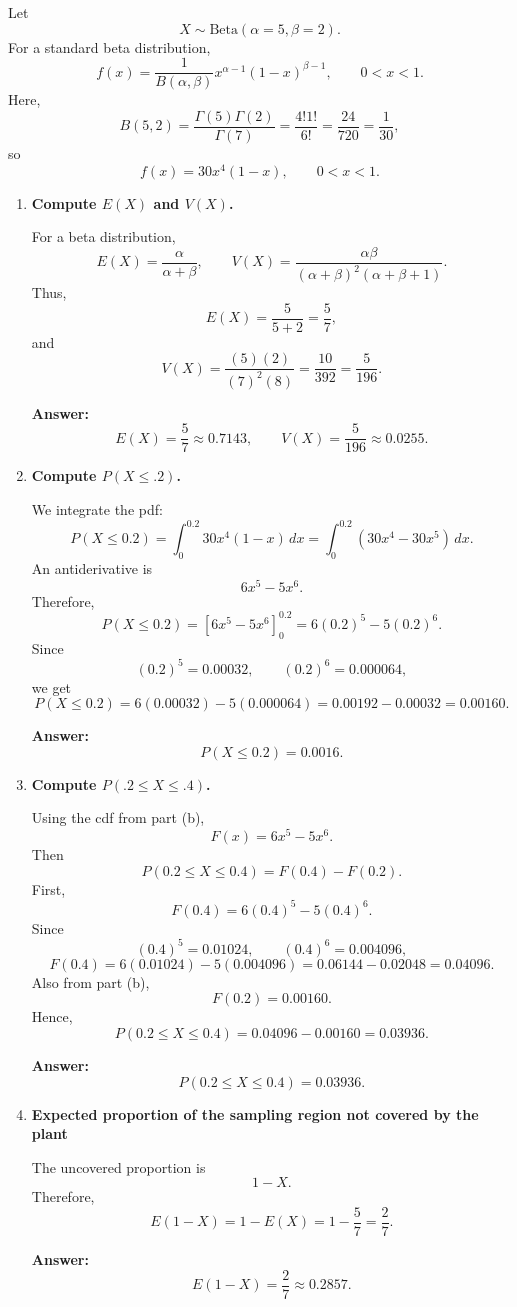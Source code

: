 Let
\[
X\sim \text{Beta}(\alpha=5,\beta=2).
\]
For a standard beta distribution,
\[
f(x)=\frac{1}{B(\alpha,\beta)}x^{\alpha-1}(1-x)^{\beta-1}, \qquad 0<x<1.
\]
Here,
\[
B(5,2)=\frac{\Gamma(5)\Gamma(2)}{\Gamma(7)}=\frac{4!1!}{6!}=\frac{24}{720}=\frac{1}{30},
\]
so
\[
f(x)=30x^4(1-x), \qquad 0<x<1.
\]

\begin{enumerate}
    \item[(a)] \textbf{Compute $E(X)$ and $V(X)$.}

    For a beta distribution,
    \[
    E(X)=\frac{\alpha}{\alpha+\beta}, \qquad V(X)=\frac{\alpha\beta}{(\alpha+\beta)^2(\alpha+\beta+1)}.
    \]
    Thus,
    \[
    E(X)=\frac{5}{5+2}=\frac{5}{7},
    \]
    and
    \[
    V(X)=\frac{(5)(2)}{(7)^2(8)}=\frac{10}{392}=\frac{5}{196}.
    \]

    \textbf{Answer:}
    \[
    E(X)=\frac{5}{7}\approx 0.7143, \qquad V(X)=\frac{5}{196}\approx 0.0255.
    \]

    \item[(b)] \textbf{Compute $P(X\le .2)$.}

    We integrate the pdf:
    \[
    P(X\le 0.2)=\int_0^{0.2} 30x^4(1-x)\,dx
    =\int_0^{0.2} (30x^4-30x^5)\,dx.
    \]
    An antiderivative is
    \[
    6x^5-5x^6.
    \]
    Therefore,
    \[
    P(X\le 0.2)=\left[6x^5-5x^6\right]_0^{0.2}
    =6(0.2)^5-5(0.2)^6.
    \]
    Since
    \[
    (0.2)^5=0.00032,\qquad (0.2)^6=0.000064,
    \]
    we get
    \[
    P(X\le 0.2)=6(0.00032)-5(0.000064)=0.00192-0.00032=0.00160.
    \]

    \textbf{Answer:}
    \[
    P(X\le 0.2)=0.0016.
    \]

    \item[(c)] \textbf{Compute $P(.2\le X\le .4)$.}

    Using the cdf from part (b),
    \[
    F(x)=6x^5-5x^6.
    \]
    Then
    \[
    P(0.2\le X\le 0.4)=F(0.4)-F(0.2).
    \]
    First,
    \[
    F(0.4)=6(0.4)^5-5(0.4)^6.
    \]
    Since
    \[
    (0.4)^5=0.01024,\qquad (0.4)^6=0.004096,
    \]
    \[
    F(0.4)=6(0.01024)-5(0.004096)=0.06144-0.02048=0.04096.
    \]
    Also from part (b),
    \[
    F(0.2)=0.00160.
    \]
    Hence,
    \[
    P(0.2\le X\le 0.4)=0.04096-0.00160=0.03936.
    \]

    \textbf{Answer:}
    \[
    P(0.2\le X\le 0.4)=0.03936.
    \]

    \item[(d)] \textbf{Expected proportion of the sampling region not covered by the plant}

    The uncovered proportion is
    \[
    1-X.
    \]
    Therefore,
    \[
    E(1-X)=1-E(X)=1-\frac{5}{7}=\frac{2}{7}.
    \]

    \textbf{Answer:}
    \[
    E(1-X)=\frac{2}{7}\approx 0.2857.
    \]
\end{enumerate}

